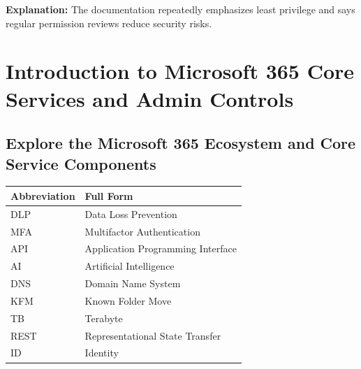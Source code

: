 \documentclass[10pt]{article}
\begin{document}
\begin{enumerate}[leftmargin=*]
\textbf{Explanation:} The documentation repeatedly emphasizes least privilege and says regular permission reviews reduce security risks.

\end{enumerate}

\clearpage
\section{Introduction to Microsoft 365 Core Services and Admin Controls}
\clearpage
\subsection{Explore the Microsoft 365 Ecosystem and Core Service Components}

\begin{center}
\begin{tabular}{>{\raggedright\arraybackslash}p{} >{\raggedright\arraybackslash}p{}}
\toprule
\textbf{Abbreviation} & \textbf{Full Form} \\
\midrule
DLP & Data Loss Prevention \\
MFA & Multifactor Authentication \\
API & Application Programming Interface \\
AI & Artificial Intelligence \\
DNS & Domain Name System \\
KFM & Known Folder Move \\
TB & Terabyte \\
REST & Representational State Transfer \\
ID & Identity \\
\bottomrule
\end{tabular}
\end{center}
\end{document}
